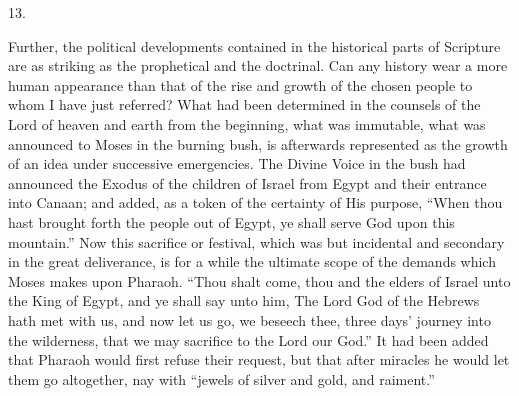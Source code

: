 13.

Further, the political developments contained in the
historical parts of Scripture are as striking as the
prophetical and the doctrinal. Can any history wear a
more human appearance than that of the rise and growth of
the chosen people to whom I have just referred? What had
been determined in the counsels of the Lord of heaven and
earth from the beginning, what was immutable, what was
announced to Moses in the burning bush, is afterwards
represented as the growth of an idea under successive
emergencies. The Divine Voice in the bush had announced
the Exodus of the children of Israel from Egypt and their entrance into Canaan; and added, as a token of the
certainty of His purpose, ``When thou hast brought
forth the people out of Egypt, ye shall serve God upon
this mountain.'' Now this sacrifice or festival,
which was but incidental and secondary in the great
deliverance, is for a while the ultimate scope of the
demands which Moses makes upon Pharaoh. ``Thou shalt
come, thou and the elders of Israel unto the King of
Egypt, and ye shall say unto him, The Lord God of the
Hebrews hath met with us, and now let us go, we beseech
thee, three days' journey into the wilderness, that we
may sacrifice to the Lord our God.'' It had been
added that Pharaoh would first refuse their request, but
that after miracles he would let them go altogether, nay
with ``jewels of silver and gold, and raiment.''

